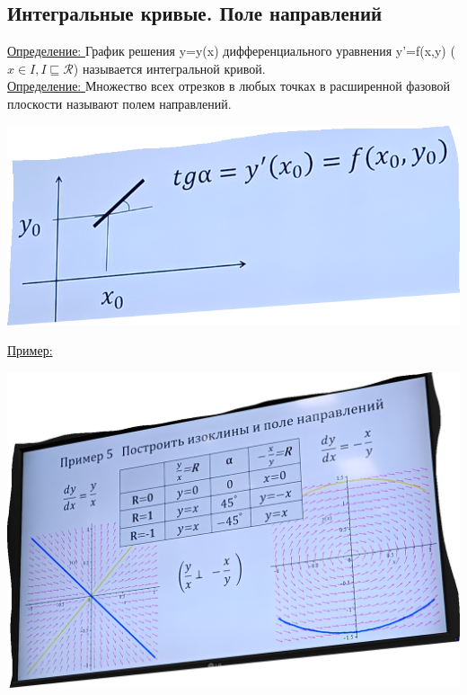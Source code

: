\documentclass[12pt]{article}
\let\ORIincludegraphics\includegraphics
\renewcommand{\includegraphics}[2][]{\ORIincludegraphics[scale=0.65,#1]{#2}}
\begin{document}
  \subsection{Интегральные кривые. Поле направлений}
  \underline{Определение: }График решения y=y(x) дифференциального уравнения y'=f(x,y)
  ($x \in I, I \sqsubseteq \mathcal{R}$) называется интегральной кривой.\\
  \underline{Определение: } Множество всех отрезков в любых точках в расширенной фазовой плоскости
  называют полем направлений.
  \begin{center}
    \includegraphics{"1.6.1.png"}
  \end{center}
  \underline{Пример:}
  \begin{center}
    \includegraphics[scale=0.7]{"1.6.2.png"}
  \end{center}
\end{document}
